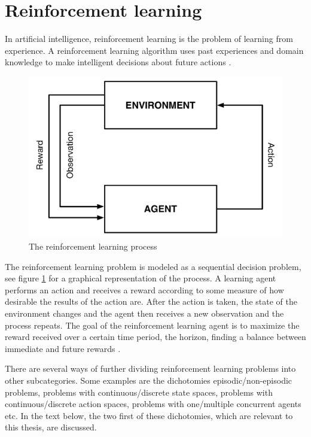 \section{Reinforcement learning}

In artificial intelligence, reinforcement learning is the problem of learning from experience. A reinforcement learning algorithm uses past experiences and domain knowledge to make intelligent decisions about future actions \parencite{barto1998reinforcement}.

\begin{figure}[htbp]
\includegraphics[width=\textwidth]{images/agent-environment.pdf}
\caption{The reinforcement learning process}
\label{fig:agentandenvironment}
\end{figure}

The reinforcement learning problem is modeled as a sequential decision problem, see figure \ref{fig:agentandenvironment} for a graphical representation of the process. A learning agent performs an action and receives a reward according to some measure of how desirable the results of the action are.  After the action is taken, the state of the environment changes and the agent then receives a new observation and the process repeats. The goal of the reinforcement learning agent is to maximize the reward received over a certain time period, the horizon, finding a balance between immediate and future rewards \parencite{barto1998reinforcement}. 

There are several ways of further dividing reinforcement learning problems into other subcategories. Some examples are the dichotomies episodic/non-episodic problems, problems with continuous/discrete state spaces, problems with continuous/discrete action spaces, problems with one/multiple concurrent agents etc. In the text below, the two first of these dichotomies, which are relevant to this thesis, are discussed. 

